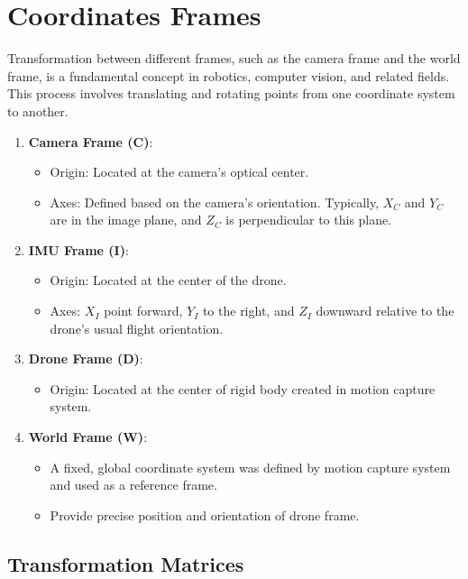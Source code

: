 \section{Coordinates Frames}
Transformation between different frames, such as the camera frame and the world frame, is a fundamental concept in robotics, computer vision, and related fields. This process involves translating and rotating points from one coordinate system to another.
\begin{enumerate}
    \item \textbf{Camera Frame (C)}: 
    \begin{itemize}
        \item Origin: Located at the camera's optical center.
        \item Axes: Defined based on the camera's orientation. Typically, \( X_C \) and \( Y_C \) are in the image plane, and \( Z_C \) is perpendicular to this plane.
    \end{itemize}
    \item \textbf{IMU Frame (I)}:
    \begin{itemize}
        \item Origin: Located at the center of the drone.
        \item Axes: \( X_I \) point forward, \( Y_I \) to the right, and \( Z_I \) downward relative to the drone's usual flight orientation.
    \end{itemize}
    \item \textbf{Drone Frame (D)}:
    \begin{itemize}
        \item Origin: Located at the center of rigid body created in motion capture system.
    \end{itemize}

    \item \textbf{World Frame (W)}: 
    \begin{itemize}
        \item A fixed, global coordinate system was defined by motion capture system and used as a reference frame.
        \item Provide precise position and orientation of drone frame.
    \end{itemize}
\end{enumerate}

\subsection{Transformation Matrices}

